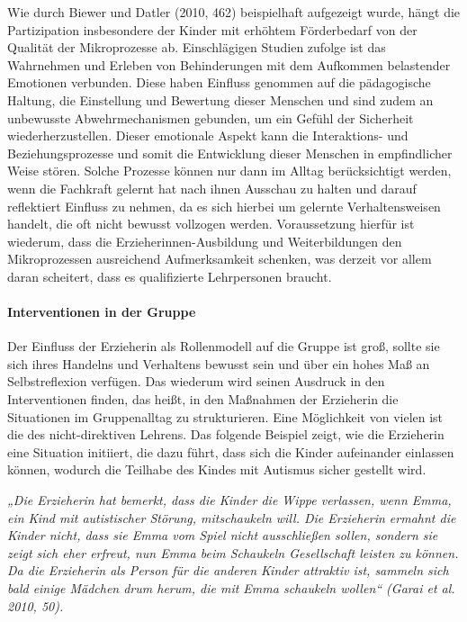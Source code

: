 Wie durch Biewer und Datler (2010, 462) beispielhaft aufgezeigt wurde, hängt die Partizipation insbesondere der Kinder mit erhöhtem Förderbedarf von der Qualität der Mikroprozesse ab. Einschlägigen Studien zufolge ist das Wahrnehmen und Erleben von Behinderungen mit dem Aufkommen belastender Emotionen verbunden. Diese haben Einfluss genommen auf die pädagogische Haltung, die Einstellung und Bewertung dieser Menschen und sind zudem an unbewusste Abwehrmechanismen gebunden, um ein Gefühl der Sicherheit wiederherzustellen. Dieser emotionale Aspekt kann die Interaktions- und Beziehungsprozesse und somit die Entwicklung dieser Menschen in empfindlicher Weise stören. Solche Prozesse können nur dann im Alltag berücksichtigt werden, wenn die Fachkraft gelernt hat nach ihnen Ausschau zu halten und darauf reflektiert Einfluss zu nehmen, da es sich hierbei um gelernte Verhaltensweisen handelt, die oft nicht bewusst vollzogen werden. Voraussetzung hierfür ist wiederum, dass die Erzieherinnen-Ausbildung und Weiterbildungen den Mikroprozessen ausreichend Aufmerksamkeit schenken, was derzeit vor allem daran scheitert, dass es qualifizierte Lehrpersonen braucht.  
    
\paragraph{Interventionen in der Gruppe}
Der Einfluss der Erzieherin als Rollenmodell auf die Gruppe ist groß, sollte sie sich ihres Handelns und Verhaltens bewusst sein und über ein hohes Maß an Selbstreflexion verfügen. Das wiederum wird seinen Ausdruck in den Interventionen finden, das heißt, in den Maßnahmen der Erzieherin die Situationen im Gruppenalltag zu strukturieren. Eine Möglichkeit von vielen ist die des nicht-direktiven Lehrens. Das folgende Beispiel zeigt, wie die Erzieherin eine Situation initiiert, die dazu führt, dass sich die Kinder aufeinander einlassen können, wodurch die Teilhabe des Kindes mit Autismus sicher gestellt wird. 

\emph{„Die Erzieherin hat bemerkt, dass die Kinder die Wippe verlassen, wenn Emma, ein Kind mit autistischer Störung, mitschaukeln will. Die Erzieherin ermahnt die Kinder nicht, dass sie Emma vom Spiel nicht ausschließen sollen, sondern sie zeigt sich eher erfreut, nun Emma beim Schaukeln Gesellschaft leisten zu können. Da die Erzieherin als Person für die anderen Kinder attraktiv ist, sammeln sich bald einige Mädchen drum herum, die mit Emma schaukeln wollen“ (Garai et al. 2010, 50).}

